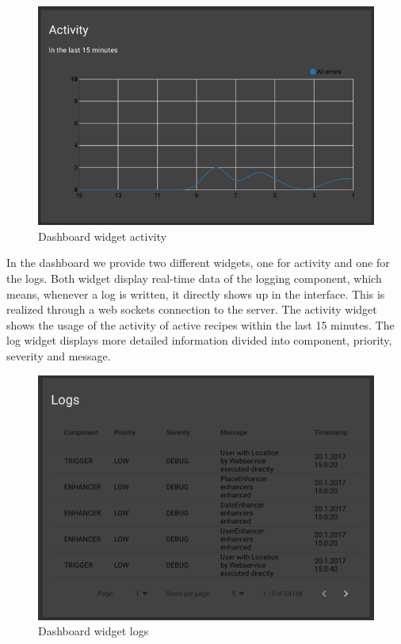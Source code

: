 \documentclass[11pt]{article} %
\begin{document}
\begin{figure}[H]
\begin{center}
\includegraphics[width=1.0\textwidth]{dashboard_activity}
\end{center}
\caption{Dashboard widget activity}
\label{fig:dashboard_activity}
\end{figure}

In the dashboard we provide two different widgets, one for activity and one for the logs. Both widget display real-time data of the logging component, which means, whenever a log is written, it directly shows up in the interface. This is realized through a web sockets connection to the server. The activity widget shows the usage of the activity of active recipes within the last 15 minutes. The log widget displays more detailed information divided into component, priority, severity and message.

\begin{figure}[H]
\begin{center}
\includegraphics[width=1.0\textwidth]{dashboard_logs}
\end{center}
\caption{Dashboard widget logs}
\label{fig:dashboard_logs}
\end{figure}
\end{document}
